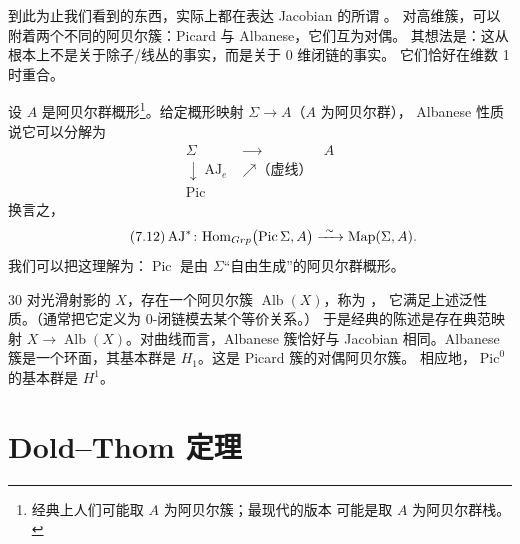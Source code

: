 到此为止我们看到的东西，实际上都在表达 Jacobian 的所谓 。
对高维簇，可以附着两个不同的阿贝尔簇：Picard 与 Albanese，它们互为对偶。
其想法是：这从根本上不是关于除子/线丛的事实，而是关于 0 维闭链的事实。
它们恰好在维数 1 时重合。

设 $A$ 是阿贝尔群概形\footnote{经典上人们可能取 $A$ 为阿贝尔簇；最现代的版本
可能是取 $A$ 为阿贝尔群栈。}。给定概形映射 $\Sigma\to A$（$A$ 为阿贝尔群），
Albanese 性质说它可以分解为
\begin{equation}\tag{7.11}\label{eq:7.11}
\begin{array}{ccc}
\Sigma & \xrightarrow{\qquad} & A\\[2pt]
\downarrow{\scriptstyle \operatorname{AJ}_e}
& \nearrow{\scriptstyle \text{（虚线）}} & \\[2pt]
\operatorname{Pic} & &
\end{array}
\end{equation}
换言之，
\begin{equation}\tag{7.12}\label{eq:7.12}
\operatorname{AJ}^*\colon\mathrm{Hom}_{Grp}\bigl(\operatorname{Pic}\Sigma,A\bigr)
\xrightarrow{\ \sim\ }\operatorname{Map}(\Sigma,A).
\end{equation}
我们可以把这理解为：$\operatorname{Pic}$ 是由 $\Sigma$“自由生成”的阿贝尔群概形。

\begin{srcrem}{30}
对光滑射影的 $X$，存在一个阿贝尔簇 $\operatorname{Alb}(X)$，称为 ，
它满足上述泛性质。（通常把它定义为 0-闭链模去某个等价关系。）
于是经典的陈述是存在典范映射 $X\to\operatorname{Alb}(X)$。对曲线而言，Albanese 簇恰好与
Jacobian 相同。Albanese 簇是一个环面，其基本群是 $H_1$。这是 Picard 簇的对偶阿贝尔簇。
相应地，$\operatorname{Pic}^0$ 的基本群是 $H^1$。
\end{srcrem}


\section{Dold--Thom 定理}

